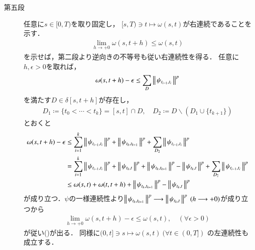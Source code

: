 \begin{prf}
\begin{description}
			\item[第五段]
				任意に$s \in [0,T)$を取り固定し，
				$[s,T) \ni t \longmapsto \omega(s,t)$が右連続であることを示す．
				\begin{align}
					\lim_{h \to +0} \omega(s,t+h) \leq \omega(s,t)
					\label{eq:thm_continuity_of_norm_val_p_variation_3}
				\end{align}
				を示せば，第二段より逆向きの不等号も従い右連続性を得る．
				任意に$h,\epsilon > 0$を取れば，
				\begin{align}
					\omega(s,t + h) - \epsilon
					\leq \sum_D \left\|\, \psi_{t_{i-1},t_i}\, \right\|_{}^p
				\end{align}
				を満たす$D \in \delta[s,t+h]$が存在し，
				\begin{align}
					D_1 \coloneqq \{t_0 < \cdots < t_k\} = [s,t] \cap D,
					\quad 
					D_2 \coloneqq D \backslash \left( D_1 \cup \{ t_{k+1} \} \right)
				\end{align}
				とおくと
				\begin{align}
					\omega(s,t + h) - \epsilon
					&\leq \sum_{i=1}^{k} \left\|\, \psi_{t_{i-1},t_i}\, \right\|_{}^p 
						+ \left\|\, \psi_{t_k,t_{k+1}}\, \right\|_{}^p + \sum_{D_2} \left\|\, \psi_{t_{i-1},t_i}\, \right\|_{}^p \\
					&= \sum_{i=1}^{k} \left\|\, \psi_{t_{i-1},t_i}\, \right\|_{}^p 
						+ \left\|\, \psi_{t_k,t}\, \right\|_{}^p + \left\|\, \psi_{t_k,t_{k+1}}\, \right\|_{}^p - \left\|\, \psi_{t_k,t}\, \right\|_{}^p
						+ \sum_{D_2} \left\|\, \psi_{t_{i-1},t_i}\, \right\|_{}^p \\
					&\leq \omega(s,t) + \omega(t,t+h) + \left\|\, \psi_{t_k,t_{k+1}}\, \right\|_{}^p - \left\|\, \psi_{t_k,t}\, \right\|_{}^p
				\end{align}
				が成り立つ．$\psi$の一様連続性より$\left\|\, \psi_{t_k,t_{k+1}}\, \right\|_{}^p \longrightarrow \left\|\, \psi_{t_k,t}\, \right\|_{}^p\ (h \longrightarrow +0)$が成り立つから
				\begin{align}
					\lim_{h \to +0} \omega(s,t+h) - \epsilon \leq \omega(s,t),
					\quad (\forall \epsilon > 0)
				\end{align}
				が従い()が出る．
				同様に$(0,t] \ni s \longmapsto \omega(s,t)\ (\forall t \in (0,T])$
				の左連続性も成立する．
				

\end{description}
\end{prf}

